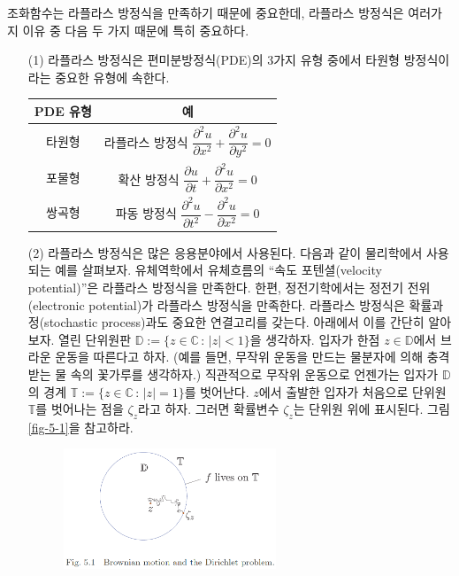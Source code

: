 조화함수는 라플라스 방정식을 만족하기 때문에 중요한데,
라플라스 방정식은 여러가지 이유 중 다음 두 가지 때문에 특히 중요하다.
\begin{itemize}
\item[(1)] 라플라스 방정식은 편미분방정식(PDE)의 3가지 유형 중에서 
타원형 방정식이라는 중요한 유형에 속한다.
\begin{center}
\begin{tabular}{ |c|c| } 
 \hline
PDE 유형 & 예 \\ \hline \hline
타원형 & 라플라스 방정식 
$\dfrac{\partial^2 u}{\partial x^2} 
+ \dfrac{\partial^2 u}{\partial y^2} =0$ \\[1ex] \hline
포물형 & 확산 방정식 $\dfrac{\partial u}{\partial t} 
+ \dfrac{\partial^2 u}{\partial x^2} =0$ \\[1ex] \hline
쌍곡형 & 파동 방정식 $\dfrac{\partial^2 u}{\partial t^2} 
- \dfrac{\partial^2 u}{\partial x^2} =0$ \\[0.5ex]
\hline
\end{tabular}
\end{center}
\item[(2)] 라플라스 방정식은 많은 응용분야에서 사용된다.
다음과 같이 물리학에서 사용되는 예를 살펴보자.
유체역학에서 유체흐름의 ``속도 포텐셜(velocity potential)''은
라플라스 방정식을 만족한다. 한편, 정전기학에서는
정전기 전위(electronic potential)가 라플라스 방정식을 만족한다.
라플라스 방정식은 확률과정(stochastic process)과도 중요한 연결고리를 갖는다.
아래에서 이를 간단히 알아보자.
열린 단위원판 $\mathbb D:= \{z\in \mathbb C\,:\, |z|<1\}$을 생각하자.
입자가 한점 $z\in\mathbb D$에서 브라운 운동을 따른다고 하자.
(예를 들면, 무작위 운동을 만드는 물분자에 의해 충격받는 물 속의
꽃가루를 생각하자.)
직관적으로 무작위 운동으로 언젠가는 입자가 $\mathbb D$의 경계 
$\mathbb T:= \{ z\in \mathbb C \,:\, |z|=1 \}$를 벗어난다.
$z$에서 출발한 입자가 처음으로 단위원 $\mathbb T$를 벗어나는 
점을 $\zeta_z$라고 하자. 그러면 확률변수 $\zeta_z$는 단위원 위에 표시된다.
그림 \ref{fig-5-1}을 참고하라.
\begin{figure}[h!]
\begin{center}
\includegraphics[width=0.6\textwidth]{./SaltChapter/fig-5-1}

\end{center}
\end{figure}
\end{itemize}
